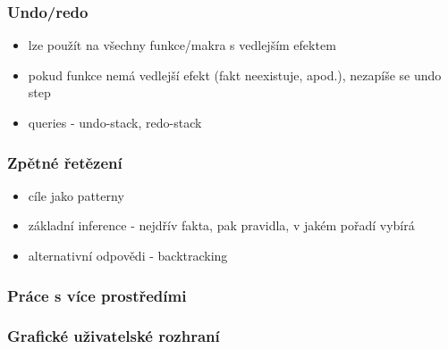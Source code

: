 \subsubsection{Undo/redo}
\begin{framed}
  \begin{itemize}
    \item lze použít na všechny funkce/makra s vedlejším efektem
    \item pokud funkce nemá vedlejší efekt (fakt neexistuje, apod.), nezapíše se
      undo step
    \item queries - undo-stack, redo-stack
  \end{itemize}
\end{framed}

\subsubsection{Zpětné řetězení}
\begin{framed}
  \begin{itemize}
    \item cíle jako patterny
    \item základní inference - nejdřív fakta, pak pravidla, v jakém pořadí
      vybírá
    \item alternativní odpovědi - backtracking
  \end{itemize}
\end{framed}

\subsubsection{Práce s více prostředími}

\subsubsection{Grafické uživatelské rozhraní}
